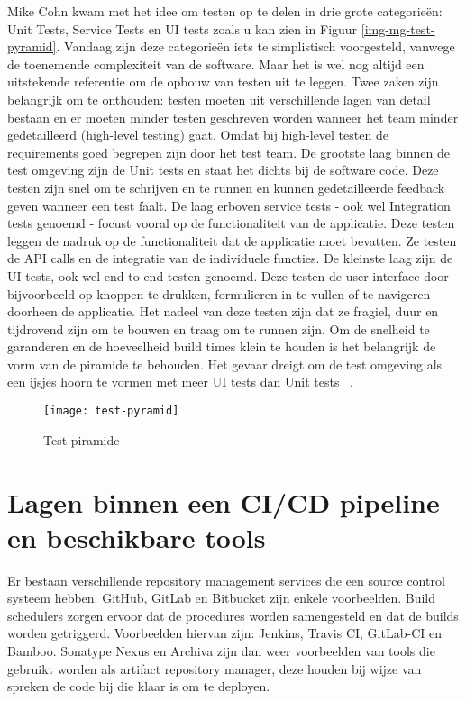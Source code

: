     Mike Cohn kwam met het idee om testen op te delen in drie grote categorieën: Unit Tests, Service Tests en UI tests zoals u kan zien in Figuur \ref{img-mg-test-pyramid}.
    Vandaag zijn deze categorieën iets te simplistisch voorgesteld, vanwege de toenemende complexiteit van de software. Maar het is wel nog altijd een uitstekende referentie om de opbouw van testen uit te leggen.
    Twee zaken zijn belangrijk om te onthouden: testen moeten uit verschillende lagen van detail bestaan en er moeten minder testen geschreven worden wanneer het team minder gedetailleerd (high-level testing) gaat. Omdat bij high-level testen de requirements goed begrepen zijn door het test team.
    De grootste laag binnen de test omgeving zijn de Unit tests en staat het dichts bij de software code. Deze testen zijn snel om te schrijven en te runnen en kunnen gedetailleerde feedback geven wanneer een test faalt.
    De laag erboven service tests - ook wel Integration tests genoemd - focust vooral op de functionaliteit van de applicatie.
    Deze testen leggen de nadruk op de functionaliteit dat de applicatie moet bevatten. Ze testen de API calls en de integratie van de individuele functies.
    De kleinste laag zijn de UI tests, ook wel end-to-end testen genoemd. Deze testen de user interface door bijvoorbeeld op knoppen te drukken, formulieren in te vullen of te navigeren doorheen de applicatie. Het nadeel van deze testen zijn dat ze fragiel, duur en tijdrovend zijn om te bouwen en traag om te runnen zijn.
    Om de snelheid te garanderen en de hoeveelheid build times klein te houden is het belangrijk de vorm van de piramide te behouden. Het gevaar dreigt om de test omgeving als een ijsjes hoorn te vormen met meer UI tests dan Unit tests ~\autocite{Fowler2012}.
    \begin{figure}	
        \texttt{[image: test-pyramid]}
        \caption{Test piramide ~\autocite{Vocke2018}} \label{img-test-pyramid}
    \end{figure}

\section{Lagen binnen een CI/CD pipeline en beschikbare tools}
\label{sec:lagen-binnen-pipeline}
Er bestaan verschillende repository management services die een source control systeem hebben. GitHub, GitLab en Bitbucket zijn enkele voorbeelden.
Build schedulers zorgen ervoor dat de procedures worden samengesteld en dat de builds worden getriggerd. Voorbeelden hiervan zijn: Jenkins, Travis CI, GitLab-CI en Bamboo. Sonatype Nexus en Archiva zijn dan weer voorbeelden van tools die gebruikt worden als artifact repository manager, deze houden bij wijze van spreken de code bij die klaar is om te deployen. 

